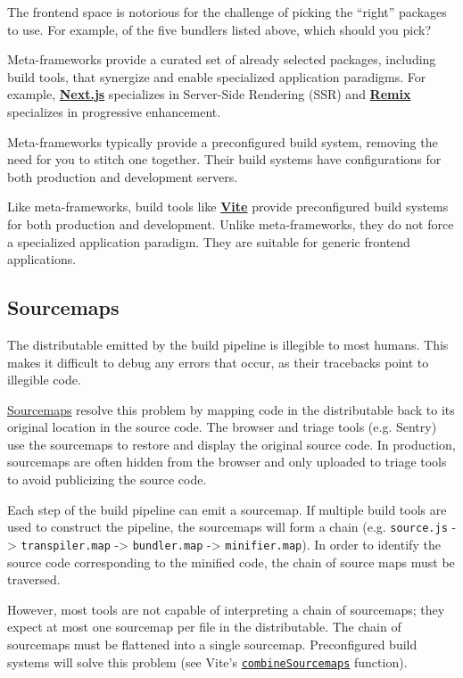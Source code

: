 \documentclass{article}
\newcommand{\tb}{\textbf}
\newcommand{\tc}{\texttt}
\begin{document}
The frontend space is notorious for the challenge of picking the ``right'' packages to use. For
example, of the five bundlers listed above, which should you pick?

Meta-frameworks provide a curated set of already selected packages, including build tools, that
synergize and enable specialized application paradigms. For example,
\href{https://nextjs.org}{\tb{Next.js}} specializes in Server-Side Rendering (SSR) and
\href{https://remix.run}{\tb{Remix}} specializes in progressive enhancement.

Meta-frameworks typically provide a preconfigured build system, removing the need for you to stitch
one together. Their build systems have configurations for both production and development servers.

Like meta-frameworks, build tools like \href{https://vitejs.dev/}{\tb{Vite}} provide preconfigured
build systems for both production and development. Unlike meta-frameworks, they do not force a
specialized application paradigm. They are suitable for generic frontend applications.

\subsection{Sourcemaps}

The distributable emitted by the build pipeline is illegible to most humans. This makes it difficult
to debug any errors that occur, as their tracebacks point to illegible code.

\href{https://developer.chrome.com/blog/sourcemaps/}{Sourcemaps} resolve this problem by mapping
code in the distributable back to its original location in the source code. The browser and triage
tools (e.g. Sentry) use the sourcemaps to restore and display the original source code. In
production, sourcemaps are often hidden from the browser and only uploaded to triage tools to avoid
publicizing the source code.

Each step of the build pipeline can emit a sourcemap. If multiple build tools are used to construct
the pipeline, the sourcemaps will form a chain (e.g. \tc{source.js} -> \texttt{transpiler.map} ->
\tc{bundler.map} -> \texttt{minifier.map}). In order to identify the source code corresponding to
the minified code, the chain of source maps must be traversed.

However, most tools are not capable of interpreting a chain of sourcemaps; they expect at most one
sourcemap per file in the distributable. The chain of sourcemaps must be flattened into a single
sourcemap. Preconfigured build systems will solve this problem (see Vite's
\href{https://github.com/vitejs/vite/blob/feae09fdfab505e58950c915fe5d8dd103d5ffb9/packages/vite/src/node/utils.ts\#L831}{\tc{combineSourcemaps}}
function).
\end{document}
